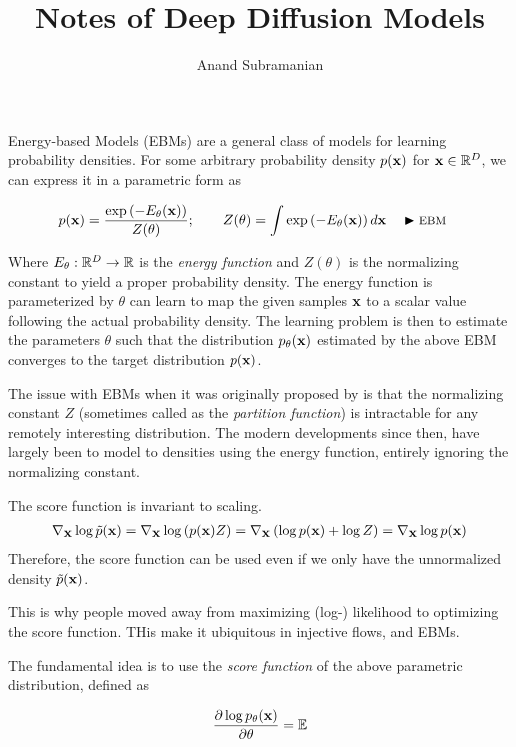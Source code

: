 \documentclass[a4paper, 11pt]{article}
\title{Notes of Deep Diffusion Models}
\author{Anand Subramanian}
\date{}
\begin{document}
 
\maketitle

\tableofcontents


Energy-based Models (EBMs) are a general class of models for learning probability densities. For some arbitrary probability density $p(\mbox{$\mbox{$\mathbf{x}$}$})$ for $\mbox{$\mbox{$\mathbf{x}$}$} \in \mathbb{R}^D$, we can express it in a parametric form as

\begin{align}
p(\mbox{$\mbox{$\mathbf{x}$}$}) &= \frac{\exp \left(-E_\theta(\mbox{$\mbox{$\mathbf{x}$}$})\right)}{Z(\theta)}; \qquad Z(\theta) = \int \exp \left (-E_\theta(\mbox{$\mbox{$\mathbf{x}$}$}) \right) d\mbox{$\mbox{$\mathbf{x}$}$} && \blacktriangleright\text{\footnotesize EBM}
\end{align} 

Where $E_\theta: \mathbb{R}^D \to \mathbb{R}$ is the \textit{energy function} and $Z(\theta)$ is the normalizing constant to yield a proper probability density. The energy function is parameterized by $\theta$ can learn to map the given samples $\mbox{$\mbox{$\mathbf{x}$}$}$ to a scalar value following the actual probability density. The learning problem is then to estimate the parameters $\theta$ such that the distribution $p_\theta(\mbox{$\mbox{$\mathbf{x}$}$})$ estimated by the above EBM converges to the target distribution $p(\mbox{$\mbox{$\mathbf{x}$}$})$.

The issue with EBMs when it was originally proposed by \cite{lecun2006tutorial} is that the normalizing constant $Z$ (sometimes called as the \textit{partition function}) is intractable for any remotely interesting distribution. The modern developments since then, have largely been to model to densities using the energy function, entirely ignoring the normalizing constant.

The score function is invariant to scaling. 
\begin{align}
    \nabla_{\mbox{$\mbox{$\mathbf{x}$}$}} \log \tilde{p}(\mbox{$\mbox{$\mathbf{x}$}$}) = \nabla_{\mbox{$\mbox{$\mathbf{x}$}$}} \log \left ( p(\mbox{$\mbox{$\mathbf{x}$}$}) Z \right ) = \nabla_{\mbox{$\mbox{$\mathbf{x}$}$}} \left (  \log p(\mbox{$\mbox{$\mathbf{x}$}$}) + \log Z \right ) = \nabla_{\mbox{$\mbox{$\mathbf{x}$}$}} \log  p(\mbox{$\mbox{$\mathbf{x}$}$})
\end{align}
Therefore, the score function can be used even if we only have the unnormalized density $\tilde{p}(\mbox{$\mbox{$\mathbf{x}$}$})$. 

This is why people moved away from maximizing (log-) likelihood to optimizing the score function. THis make it ubiquitous in injective flows, and EBMs.


The fundamental idea is to use the \emph{score function} of the above parametric distribution, defined as 

\begin{align}
    \frac{\partial \log p_\theta(\mbox{$\mbox{$\mathbf{x}$}$})}{\partial \theta} = \mathbb{E} 
\end{align}
\end{document}
